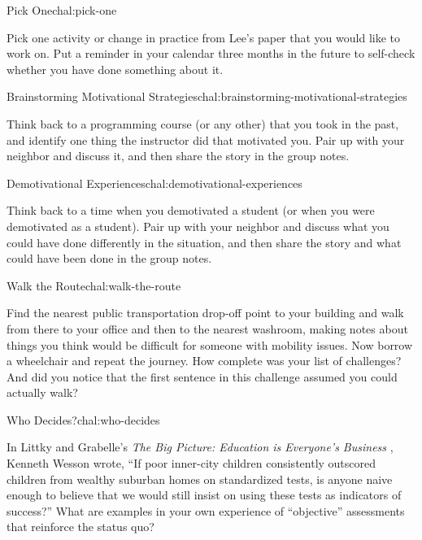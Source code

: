 \begin{challenge}{Pick One}{chal:pick-one}

Pick one activity or change in practice from Lee's paper
\cite{bib:lee-create-inclusive-community} that you would like to work
on.  Put a reminder in your calendar three months in the future to
self-check whether you have done something about it.

\end{challenge}

\begin{challenge}{Brainstorming Motivational Strategies}{chal:brainstorming-motivational-strategies}

Think back to a programming course (or any other) that you took in the
past, and identify one thing the instructor did that motivated you.
Pair up with your neighbor and discuss it, and then share the story in
the group notes.

\end{challenge}

\begin{challenge}{Demotivational Experiences}{chal:demotivational-experiences}

Think back to a time when you demotivated a student (or when you were
demotivated as a student). Pair up with your neighbor and discuss what
you could have done differently in the situation, and then share the
story and what could have been done in the group notes.

\end{challenge}

\begin{challenge}{Walk the Route}{chal:walk-the-route}

Find the nearest public transportation drop-off point to your building
and walk from there to your office and then to the nearest washroom,
making notes about things you think would be difficult for someone with
mobility issues. Now borrow a wheelchair and repeat the journey. How
complete was your list of challenges? And did you notice that the first
sentence in this challenge assumed you could actually walk?

\end{challenge}

\begin{challenge}{Who Decides?}{chal:who-decides}

In Littky and Grabelle's
\emph{The Big Picture: Education is Everyone's Business} \cite{bib:littky-big-picture},
Kenneth Wesson wrote, ``If poor inner-city children consistently
outscored children from wealthy suburban homes on standardized tests,
is anyone naive enough to believe that we would still insist on using
these tests as indicators of success?'' What are examples in your own
experience of ``objective'' assessments that reinforce the status quo?

\end{challenge}
